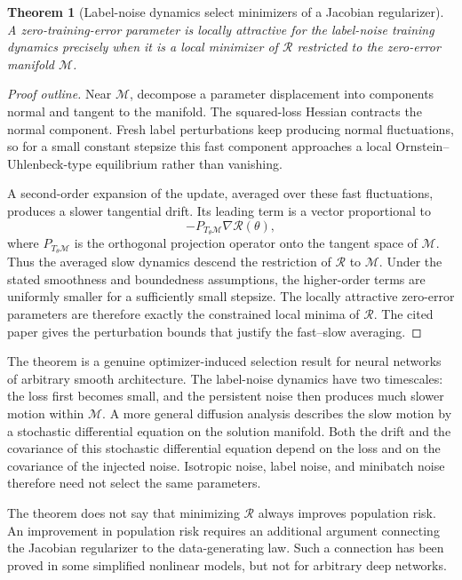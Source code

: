 \documentclass[11pt,twoside]{article}
\newtheorem{theorem}{Theorem}[section]
\theoremstyle{definition}
\theoremstyle{remark}
\begin{document}
\begin{theorem}[Label-noise dynamics select minimizers of a Jacobian regularizer]
\label{thm:label-noise-regularizer}
A zero-training-error parameter is locally attractive for the label-noise
training dynamics precisely when it is a local minimizer of
$\mathcal R$ restricted to the zero-error manifold $\mathcal M$.
\end{theorem}

\begin{proof}[Proof outline]
Near $\mathcal M$, decompose a parameter displacement into components normal
and tangent to the manifold. The squared-loss Hessian contracts the normal
component. Fresh label perturbations keep producing normal fluctuations, so
for a small constant stepsize this fast component approaches a local
Ornstein--Uhlenbeck-type equilibrium rather than vanishing.

A second-order expansion of the update, averaged over these fast
fluctuations, produces a slower tangential drift. Its leading term is a
vector proportional to
\[
 -P_{T_\theta\mathcal M}\nabla\mathcal R(\theta),
\]
where $P_{T_\theta\mathcal M}$ is the orthogonal projection operator onto the
tangent space of $\mathcal M$. Thus the averaged slow dynamics descend the
restriction of
$\mathcal R$ to $\mathcal M$. Under the stated smoothness and boundedness
assumptions, the higher-order terms are uniformly smaller for a sufficiently
small stepsize. The locally attractive zero-error parameters are therefore
exactly the constrained local minima of $\mathcal R$. The cited paper gives
the perturbation bounds that justify the fast--slow averaging.
\end{proof}

The theorem is a genuine optimizer-induced selection result for neural
networks of arbitrary smooth architecture. The label-noise dynamics have two
timescales: the loss first becomes
small, and the persistent noise then produces much slower motion within
$\mathcal M$. A more general diffusion analysis describes the slow motion by
a stochastic differential equation on the solution manifold. Both the drift
and the covariance of this stochastic differential equation depend on the
loss and on the covariance of the injected
noise. Isotropic noise, label noise, and minibatch noise therefore need not
select the same parameters.

The theorem does not say that minimizing $\mathcal R$ always improves
population risk. An improvement in population risk requires an additional
argument connecting
the Jacobian regularizer to the data-generating law. Such a connection has
been proved in some simplified nonlinear models, but not for arbitrary deep
networks.
\end{document}
